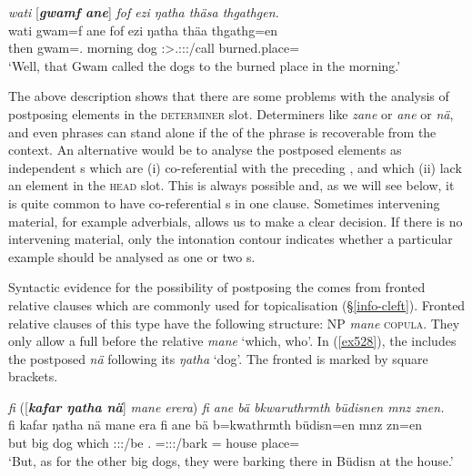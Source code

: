 \begin{exe}
	\ex \emph{wati} [\emph{\textbf{gwamf ane}}] \emph{fof ezi ŋatha thäsa thgathgen.}\\
	\gll wati gwam=f ane fof ezi ŋatha thäa thgathg=en\\
	then gwam=\Erg.{\Sg} {\Dem} {\Emph} morning dog \Stsg:\Sbj>\Tsg.\Masc:\Obj:\Pst:\Pfv/call {burned.place=\Loc}\\
	\trans `Well, that Gwam called the dogs to the burned place in the morning.'\\
	\label{ex523}
\end{exe}

The above description shows that there are some problems with the analysis of postposing elements in the \textsc{determiner} slot. Determiners like \emph{zane} or \emph{ane} or \emph{nä}, and even  phrases can stand alone if the  of the phrase is recoverable from the context. An alternative would be to analyse the postposed elements as independent s which are (i) co-referential with the preceding , and which (ii) lack an element in the \textsc{head} slot. This is always possible and, as we will see below, it is quite common to have co-referential s in one clause. Sometimes intervening material, for example adverbials, allows us to make a clear decision. If there is no intervening material, only the intonation contour indicates whether a particular example should be analysed as one or two s.

Syntactic evidence for the possibility of postposing the  comes from fronted relative clauses which are commonly used for topicalisation ({\S}\ref{info-cleft}). Fronted relative clauses of this type have the following structure: NP \emph{mane} \textsc{copula}. They only allow a full  before the relative  \emph{mane} `which, who'. In (\ref{ex528}), the  includes the postposed   \emph{nä} following its  \emph{ŋatha} `dog'. The fronted  is marked by square brackets.

\begin{exe}
	\ex \emph{fi} ([\emph{\textbf{kafar ŋatha nä}}] \emph{mane erera}) \emph{fi ane bä bkwaruthrmth büdisnen mnz znen.}\\
	\gll fi kafar ŋatha nä mane era fi ane bä b=kwathrmth büdisn=en mnz zn=en\\
	but big dog {\Indf} which \Stpl:\Sbj:\Pst:\Ipfv/be \Third.{\Abs} {\Dem} \Med{} \Med=\Stpl:\Sbj:\Pst:\Dur/bark \Pl={\Loc} house place=\Loc\\
	\trans `But, as for the other big dogs, they were barking there in Büdisn at the house.'
	\label{ex528}
\end{exe}

